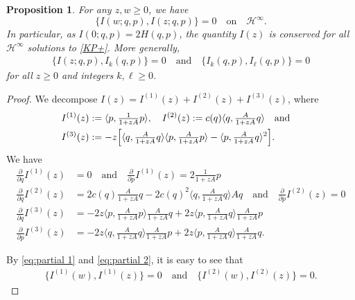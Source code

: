\documentclass[10pt,a4paper]{amsart}
\newtheorem{proposition}{Proposition}
\renewcommand{\H}{\mathcal H}
\newcommand{\qtq}[1]{\quad\text{#1}\quad}
\begin{document}
\begin{proposition}\label{P:Poisson} For any $z,w \geq 0$, we have
\begin{equation}\label{Poisson commute}
\{I(w;q,p),I(z;q,p)\}=0 \qtq{on} \H^\infty.
\end{equation}
In particular, as $I(0;q,p) =2H(q,p)$, the quantity $I(z)$ is conserved for all $\H^\infty$ solutions to \eqref{KP+}. More generally,
\begin{align}\label{1153}
\{I(z;q,p),I_k(q,p)\}=0 \qtq{and} \{I_k(q,p),I_\ell(q,p)\}=0
\end{align}
for all $z\geq0$ and integers $k,\ell\geq 0$.
\end{proposition}

\begin{proof}
We decompose $I (z)=I^{(1)}(z)+I^{(2)}(z)+I^{(3)}(z)$, where
\begin{align*}
I^{(1)}(z)&:=\langle p,\tfrac{1}{1+zA}p\rangle, \quad  I^{(2)}(z) := c(q)\langle q,\tfrac{A}{1+zA}q\rangle \qtq{and} \\
I^{(3)}(z)& := -z\Bigl[\langle q,\tfrac{A}{1+zA}q\rangle\langle p,\tfrac{A}{1+zA}p\rangle-\langle p,\tfrac{A}{1+zA}q\rangle^2\Bigr].
\end{align*}
We have 
\begin{align}
\tfrac{\partial}{\partial q} I^{(1)} (z)&= 0 \qtq{and} \tfrac{\partial}{\partial p} I^{(1)} (z)= 2 \tfrac{1}{1+zA}p \label{eq:partial 1} \\
\tfrac{\partial}{\partial q} I^{(2)} (z)&= 2 c(q)  \tfrac{A}{1+zA}q - 2 c(q)^2\langle q, \tfrac{A}{1+zA}q\rangle Aq \qtq{and} \tfrac{\partial}{\partial p} I^{(2)}(z) = 0\label{eq:partial 2}\\
\tfrac{\partial}{\partial q} I^{(3)} (z)&= -2z\langle p, \tfrac{A}{1+zA}p\rangle  \tfrac{A}{1+zA}q +2z \langle p, \tfrac{A}{1+zA}q\rangle  \tfrac{A}{1+zA}p \label{eq:partial 3}\\
\tfrac{\partial}{\partial p} I^{(3)}(z) &= -2z\langle q, \tfrac{A}{1+zA}q\rangle  \tfrac{A}{1+zA}p +2z \langle p, \tfrac{A}{1+zA}q\rangle  \tfrac{A}{1+zA}q. \label{eq:partial 4}
\end{align}

By \eqref{eq:partial 1} and \eqref{eq:partial 2}, it is easy to see that
\begin{align}\label{eq:poisson_commutativity 1}
\{I^{(1)}(w),I ^{(1)}(z) \}=0 \qtq{and} \{I^{(2)}(w),I ^{(2)}(z) \}=0.
\end{align}


\end{proof}
\end{document}
